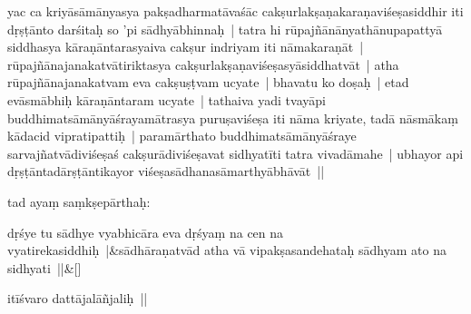 \documentclass[article,12pt,a4paper]{memoir}%
\newcounter{parCount}
\begin{document}
	  
	

	  
	  \pstart \leavevmode%
	\label{thakur75-50.7}yac ca kriyāsāmānyasya pakṣadharmatāvaśāc cakṣurlakṣaṇakaraṇaviśeṣasiddhir iti dṛṣṭānto darśitaḥ so 'pi sādhyābhinnaḥ | tatra hi rūpajñānānyathānupapattyā siddhasya kāraṇāntarasyaiva cakṣur indriyam iti nāmakaraṇāt | rūpajñānajanakatvātiriktasya cakṣurlakṣaṇaviśeṣasyāsiddhatvāt | atha rūpajñānajanakatvam eva cakṣuṣṭvam ucyate | bhavatu ko doṣaḥ | etad evāsmābhiḥ kāraṇāntaram ucyate | tathaiva yadi tvayāpi buddhimatsāmānyāśrayamātrasya puruṣaviśeṣa iti nāma kriyate, tadā nāsmākaṃ kādacid vipratipattiḥ | paramārthato buddhimatsāmānyāśraye sarvajñatvādiviśeṣaś cakṣurādiviśeṣavat sidhyatīti tatra vivadāmahe | ubhayor api dṛṣṭāntadārṣṭāntikayor viśeṣasādhanasāmarthyābhāvāt ||
	{}
	\pend%
      
	  
	

	  
	  \pstart \leavevmode%
	\label{thakur75-50.15}tad ayaṃ saṃkṣepārthaḥ:
	{}
	\pend%
      
	    
	    \stanza[\smallbreak]
	  dṛśye tu sādhye vyabhicāra eva dṛśyaṃ na cen na \label{ratnakīrtinibandhāvali__36r1PF7IMV4JB3OIRJAO5COAIMX}vyatireka\label{ratnakīrtinibandhāvali__36r1PF7IMV3NGIPUSUJNFVNEHT1}siddhiḥ |&sādhāraṇatvād atha vā vipakṣasandehataḥ sādhyam ato na sidhyati ||\&[\smallbreak]
	  
	  
	  

	  
	  \pstart \leavevmode%
	itīśvaro dattājalāñjaliḥ ||
	{}
	\pend%
      \label{īsd-sādhanasvarūpa}
	  
	
\end{document}
